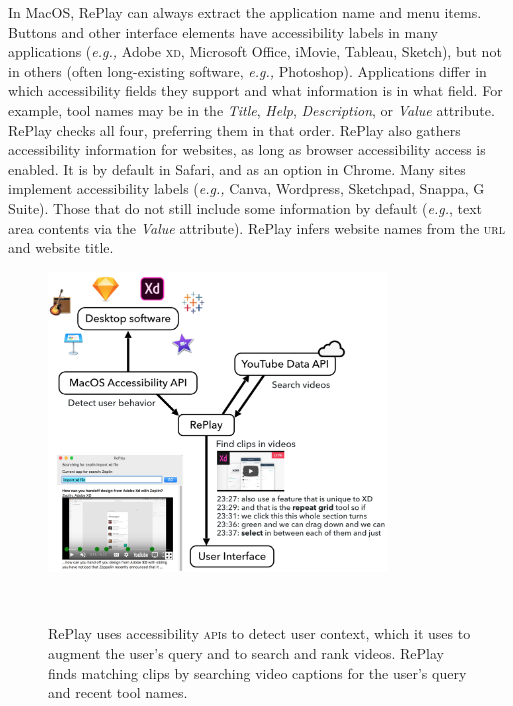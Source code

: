 In Mac\-OS, RePlay can always extract the application name and menu items. Buttons and other interface elements have accessibility labels in many applications (\textit{e.g.,} Adobe \textsc{xd}, Microsoft Office, iMovie, Tableau, Sketch), but not in others (often long-existing software, \textit{e.g.,} Photoshop). Applications differ in which accessibility fields they support and what information is in what field. For example, tool names may be in the \textit{Title}, \textit{Help}, \textit{Description}, or \textit{Value} attribute. RePlay checks all four, preferring them in that order. RePlay also gathers accessibility information for websites, as long as browser accessibility access is enabled. It is by default in Safari, and as an option in Chrome. Many sites implement accessibility labels (\textit{e.g.,} Canva, Wordpress, Sketchpad, Snappa, G Suite). Those that do not still include some information by default (\textit{e.g.}, text area contents via the \textit{Value} attribute). RePlay infers website names from the \textsc{url} and website title.

\begin{figure}[b!]
\centering
  \includegraphics[width=0.8\textwidth]{replay/figures/replay-system.png}
  \caption{RePlay uses accessibility \textsc{api}s to detect user context, which it uses to augment the user's query and to search and rank videos. RePlay finds matching clips by searching video captions for the user's query and recent tool names. }~\label{fig:replay-system}
\end{figure}

